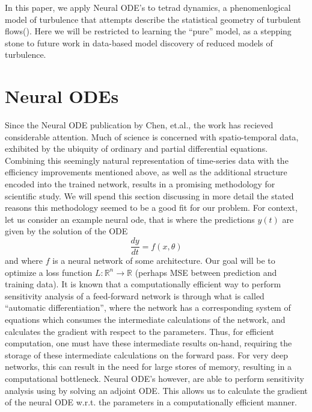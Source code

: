 \documentclass{amsart}
\newcommand{\R}{\mathbb{R}}
\begin{document}
\indent In this paper, we apply Neural ODE's to tetrad dynamics, a phenomenlogical model of turbulence that attempts describe the statistical geometry of turbulent flows(\cite{Chertkov1999}). Here we will be restricted to learning the ``pure'' model, as a stepping stone to future work in data-based model discovery of reduced models of turbulence.

\section{Neural ODEs}
Since the Neural ODE publication by Chen, et.al., the work has recieved considerable attention. Much of science is concerned with spatio-temporal data, exhibited by the ubiquity of ordinary and partial differential equations. Combining this seemingly natural representation of time-series data with the efficiency improvements mentioned above, as well as the additional structure encoded into the trained network, results in a promising methodology for scientific study. We will spend this section discussing in more detail the stated reasons this methodology seemed to be a good fit for our problem.\newline
\indent For context, let us consider an example neural ode, that is where the predictions $y(t)$ are given by the solution of the ODE
\begin{equation}
  \frac{dy}{dt} = f(x,\theta)
\end{equation}
and where $f$ is a neural network of some architecture. Our goal will be to optimize a loss function $L:\R^n \to \R$ (perhaps MSE between prediction and training data).         \newline
\indent It is known that a computationally efficient way to perform sensitivity analysis of a feed-forward network is through what is called ``automatic differentiation'', where the network has a corresponding system of equations which consumes the intermediate calculations of the network, and calculates the gradient with respect to the parameters. Thus, for efficient computation, one must have these intermediate results on-hand, requiring the storage of these intermediate calculations on the forward pass. For very deep networks, this can result in the need for large stores of memory, resulting in a computational bottleneck. Neural ODE's however, are able to perform sensitivity analysis using by solving an adjoint ODE\cite{pontriagin1962}. This allows us to calculate the gradient of the neural ODE w.r.t. the parameters in a computationally efficient manner.\newline
\end{document}
